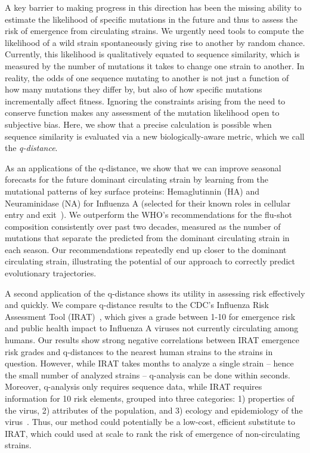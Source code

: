 \documentclass[onecolumn, compsoc,10pt]{IEEEtran}
\begin{document}
A key barrier to making progress in this direction has been the missing ability to estimate the likelihood of specific mutations in the future and thus to assess the risk of emergence from circulating strains. We urgently need tools to compute the likelihood of a wild strain spontaneously giving rise to another by random chance. Currently, this likelihood is qualitatively equated to sequence similarity, which is measured by the number of mutations it takes to change one strain to another. In reality, the odds of one sequence mutating to another is not just a function of how many mutations they differ by, but also of how specific mutations incrementally affect fitness. Ignoring the constraints arising from the need to conserve function makes any assessment of the mutation likelihood open to subjective bias. Here, we show that a precise calculation is possible when sequence similarity is evaluated via a new biologically-aware metric, which we call the \textit{q-distance}.

As an applications of the q-distance, we show that we can improve seasonal forecasts for the future dominant circulating strain by learning from the mutational patterns of key surface proteins: Hemaglutinnin (HA) and Neuraminidase (NA) for Influenza A (selected for their known roles in cellular entry and exit~\cite{gamblin2010influenza}). We outperform the WHO's recommendations for the flu-shot composition consistently over past two decades, measured as the number of mutations that separate the predicted from the dominant circulating strain in each season. Our recommendations repeatedly end up closer to the dominant circulating strain, illustrating the potential of our approach to correctly predict evolutionary trajectories. 

A second application of the q-distance shows its utility in assessing risk effectively and quickly. We compare q-distance results to the CDC's Influenza Risk Assessment Tool (IRAT)~\cite{Influenz24:online}, which gives a grade between 1-10 for emergence risk and public health impact to Influenza A viruses not currently circulating among humans. Our results show strong negative correlations between IRAT emergence risk grades and q-distances to the nearest human strains to the strains in question. However, while IRAT takes months to analyze a single strain -- hence the small number of analyzed strains -- q-analysis can be done within seconds. Moreover, q-analysis only requires sequence data, while IRAT requires information for 10 risk elements, grouped into three categories: 1) properties of the virus, 2) attributes of the population, and 3) ecology and epidemiology of the virus~\cite{Influenz24:online}. Thus, our method could potentially be a low-cost, efficient substitute to IRAT, which could used at scale to rank the risk of emergence of non-circulating strains.
\end{document}
